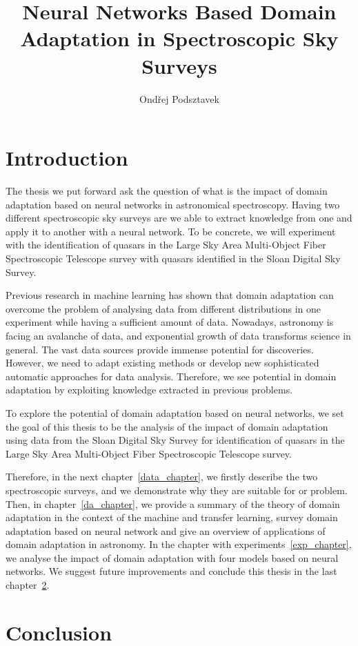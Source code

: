 \documentclass[thesis=M,english]{FITthesis}[2012/10/20]
\title{Neural Networks Based Domain Adaptation in Spectroscopic Sky Surveys}
\author{Ondřej Podsztavek}
\begin{document}
\chapter{Introduction}

The thesis we put forward ask the question of what is the impact of domain adaptation based on neural networks in astronomical spectroscopy.
Having two different spectroscopic sky surveys are we able to extract knowledge from one and apply it to another with a neural network.
To be concrete, we will experiment with the identification of quasars in the Large Sky Area Multi-Object Fiber Spectroscopic Telescope survey with quasars identified in the Sloan Digital Sky Survey.

Previous research in machine learning has shown
that domain adaptation can overcome the problem of analysing data from different distributions in one experiment
while having a sufficient amount of data.
Nowadays, astronomy is facing an avalanche of data,
and exponential growth of data transforms science in general.
The vast data sources provide immense potential for discoveries.
However, we need to adapt existing methods or develop new sophisticated automatic approaches for data analysis.
Therefore, we see potential in domain adaptation by exploiting knowledge extracted in previous problems.

To explore the potential of domain adaptation based on neural networks,
we set the goal of this thesis to be the analysis of the impact of domain adaptation
using data from the Sloan Digital Sky Survey for identification of quasars in the Large Sky Area Multi-Object Fiber Spectroscopic Telescope survey.

Therefore, in the next chapter~\ref{data_chapter},
we firstly describe the two spectroscopic surveys,
and we demonstrate why they are suitable for or problem.
Then, in chapter~\ref{da_chapter},
we provide a summary of the theory of domain adaptation in the context of the machine and transfer learning,
survey domain adaptation based on neural network
and give an overview of applications of domain adaptation in astronomy.
In the chapter with experiments~\ref{exp_chapter},
we analyse the impact of domain adaptation with four models based on neural networks.
We suggest future improvements and conclude this thesis in the last chapter~\ref{conclusion}.





\chapter{Conclusion}
\label{conclusion}
\end{document}

